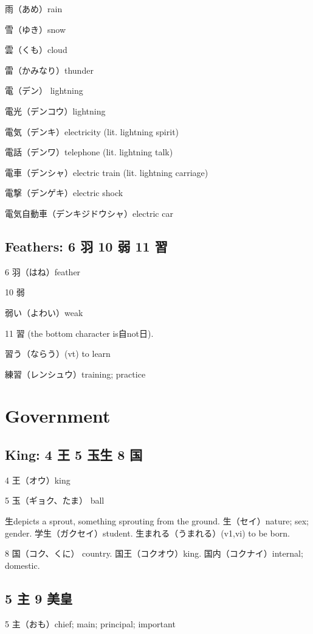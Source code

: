 雨（あめ）rain

雪（ゆき）snow

雲（くも）cloud

雷（かみなり）thunder

電（デン） lightning

電光（デンコウ）lightning

電気（デンキ）electricity (lit. lightning spirit)

電話（デンワ）telephone (lit. lightning talk)

電車（デンシャ）electric train (lit. lightning carriage)

電撃（デンゲキ）electric shock

電気自動車（デンキジドウシャ）electric car

\subsection{Feathers: 6 羽 10 弱 11 習}

6 羽（はね）feather

10 弱

弱い（よわい）weak

11 習 (the bottom character is自not日).

習う（ならう）(vt) to learn

練習（レンシュウ）training; practice

\section{Government}

\subsection{King: 4 王 5 玉生 8 国}

4 王（オウ）king

5 玉（ギョク、たま） ball

生depicts a sprout, something sprouting from the ground.
生（セイ）nature; sex; gender.
学生（ガクセイ）student.
生まれる（うまれる）(v1,vi) to be born.

8 国（コク、くに） country.
国王（コクオウ）king.
国内（コクナイ）internal; domestic.

\subsection{5 主 9 美皇}

5 主（おも）chief; main; principal; important

